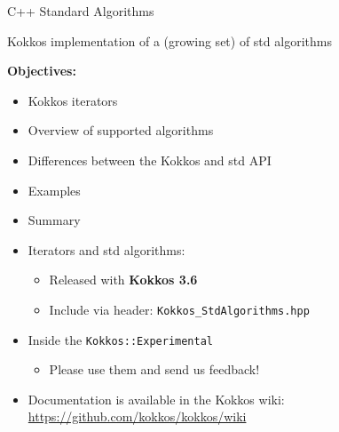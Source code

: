 

\begin{frame}[fragile]

  {\Huge C++ Standard Algorithms}

  \vspace{10pt}

  {\large Kokkos implementation of a (growing set) of std algorithms}

  \vspace{20pt}

  \textbf{Objectives:}
  \begin{itemize}
  \item {Kokkos iterators}
  \item {Overview of supported algorithms}
  \item {Differences between the Kokkos and std API}
  \item {Examples}
  \item {Summary}
  \end{itemize}

  \vspace{-20pt}

\end{frame}


\begin{frame}[fragile]

  \begin{itemize}
  \item Iterators and std algorithms:
    \begin{itemize}
    \item Released with {\bf Kokkos 3.6}
    \item Include via header: \texttt{Kokkos\_StdAlgorithms.hpp}
    \end{itemize}
    \vspace{10pt}

  \item Inside the \texttt{Kokkos::Experimental}
    \begin{itemize}
    \item Please use them and send us feedback!
    \end{itemize}

    \vspace{10pt}
  \item Documentation is available in the Kokkos wiki:\\
    \url{https://github.com/kokkos/kokkos/wiki}

  \end{itemize}

\end{frame}

